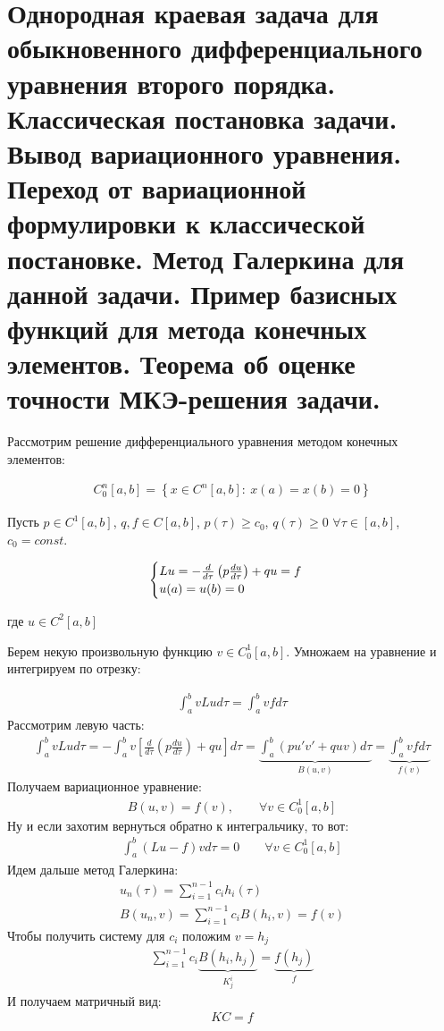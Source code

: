 \documentclass[__main__.tex]{subfiles}
\begin{document}
\section{Однородная краевая задача для обыкновенного дифференциального уравнения второго порядка. Классическая постановка задачи. Вывод вариационного уравнения. Переход от вариационной формулировки к классической постановке. Метод Галеркина для данной задачи. Пример базисных функций для метода конечных элементов. Теорема об оценке точности МКЭ-решения задачи.}

Рассмотрим решение дифференциального уравнения методом конечных элементов:

\begin{gather*}
	C_0^n[a, b]=\left\{x \in C^n[a,b]: \ x(a)=x(b)=0\right\}
\end{gather*}

Пусть $p \in C^1[a, b]$, $q, f \in C[a,b]$, $p(\tau) \geq c_0$, $q(\tau)\geq 0$ $\forall \tau \in [a,b]$, $c_0=const$. 

\begin{gather*}
	\begin{cases}
		Lu=-\frac{d}{d\tau}\left(p\frac{du}{d\tau}\right)+qu=f \hfill \\
		u(a)=u(b)=0 \hfill \\	
	\end{cases} 
\end{gather*}

где $u \in C^2[a, b]$ 

Берем некую произвольную функцию $v \in C^1_0[a,b]$. Умножаем на уравнение и интегрируем по отрезку:

\begin{gather*}
	\int_{a}^{b}vLud\tau =\int_{a}^{b}vfd\tau	
\end{gather*}
Рассмотрим левую часть:
\begin{gather*}
	\int_{a}^{b}vLud\tau = -\int_{a}^{b}v\left[\frac{d}{d\tau}\left(p\frac{du}{d\tau}\right)+qu\right]d\tau = \underbrace{\int_a^b(pu'v'+quv)d\tau}_{B(u,v)}= \underbrace{\int_a^bvfd\tau}_{f(v)}
\end{gather*}	
Получаем вариационное уравнение:
\begin{gather*}
	B(u,v)=f(v), \qquad \forall v \in C_0^1[a,b]	
\end{gather*}
Ну и если захотим вернуться обратно к интегральчику, то вот:
\begin{gather*}
	\int_a^b \left(Lu-f\right)v d\tau =0 \qquad \forall v \in C_0^1[a,b]	
\end{gather*}
Идем дальше метод Галеркина:
\begin{gather*}
	u_n(\tau)=\sum_{i=1}^{n-1}c_ih_i(\tau) \\
	B(u_n, v)=\sum_{i=1}^{n-1}c_iB(h_i, v)=f(v)
\end{gather*}
Чтобы получить систему для $c_i$ положим $v=h_j$
\begin{gather*}
	\sum_{i=1}^{n-1}c_i\underbrace{B(h_i, h_j)}_{K^i_j}=\underbrace{f(h_j)}_{f}
\end{gather*}
И получаем матричный вид:
\begin{gather*}
	KC=f
\end{gather*}
\end{document}
